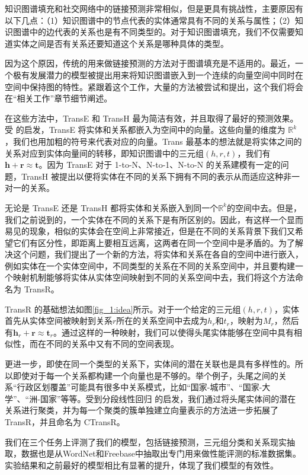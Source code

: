 知识图谱填充和社交网络中的链接预测非常相似，但是更具有挑战性，主要原因有以下几点：（1）知识图谱中的节点代表的实体通常具有不同的关系与属性；（2）知识图谱中的边代表的关系也是有不同类型的。对于知识图谱填充，我们不仅需要知道实体之间是否有关系还要知道这个关系是哪种具体的类型。

因为这个原因，传统的用来做链接预测的方法对于图谱填充是不适用的。最近，一个极有发展潜力的模型被提出用来将知识图谱嵌入到一个连续的向量空间中同时在空间中保持图的特性。紧跟着这个工作，大量的方法被尝试和提出，这个我们将会在``相关工作''章节细节阐述。

在这些方法中，TransE \cite{bordes2013translating} 和 TransH \cite{wang2014knowledge} 最为简洁有效，并且取得了最好的预测效果。受 \cite{mikolov2013distributed} 的启发，TransE 将实体和关系都嵌入为空间中的向量。这些向量的维度为 $\mathbb{R}^k$，我们也用加粗的符号来代表对应的向量。Trans 最基本的想法就是将实体之间的关系对应到实体向量间的转移，即知识图谱中的三元组$(h, r, t)$，我们有$\mathbf{h} + \mathbf{r} \approx \mathbf{t}$。因为 TransE 对于 1-to-N、N-to-1、N-to-N 的关系建模有一定的问题，TransH 被提出以便将实体在不同的关系下拥有不同的表示从而适应这种非一对一的关系。

无论是 TransE 还是 TransH 都将实体和关系嵌入到同一个$\mathbb{R}^k$的空间中去。但是，我们之前说到的，一个实体在不同的关系下是有所区别的。因此，有这样一个显而易见的现象，相似的实体会在空间上非常接近，但是在不同的关系背景下我们又希望它们有区分性，即距离上要相互远离，这两者在同一个空间中是矛盾的。为了解决这个问题，我们提出了一个新的方法，将实体和关系在各自的空间中进行嵌入，例如实体在一个实体空间中，不同类型的关系在不同的关系空间中，并且要构建一个映射机制能够将实体从实体空间映射到不同的关系空间中去，我们将这个方法命名为 TransR。

TransR 的基础想法如图\ref{fig_1:idea}所示。对于一个给定的三元组$(h, r, t)$，实体首先从实体空间被映射到关系$r$所在的关系空间中去成为$h_r$和$t_r$，映射为$M_r$，然后有$\mathbf{h}_r + \mathbf{r} \approx \mathbf{t}_r$。通过这样的一种映射，我们可以使得头尾实体能够在空间中具有相似性，而在不同的关系中又有不同的空间表现。

更进一步，即使在同一个类型的关系下，实体间的潜在关联也是具有多样性的。所以即使对于每一个关系都构建一个向量也是不够的。举个例子，头尾之间的关系``行政区划覆盖''可能具有很多中关系模式，比如``国家-城市''、``国家-大学''、``洲-国家''等等。受到分段线性回归 \cite{ritzema1994drainage} 的启发，我们通过将头尾实体间的潜在关系进行聚类，并为每一个聚类的簇单独建立向量表示的方法进一步拓展了TransR，并且命名为 CTransR。
 
我们在三个任务上评测了我们的模型，包括链接预测，三元组分类和关系现实抽取，数据也是从WordNet和Freebase中抽取出专门用来做性能评测的标准数据集。实验结果和之前最好的模型相比有显著的提升，体现了我们模型的有效性。

